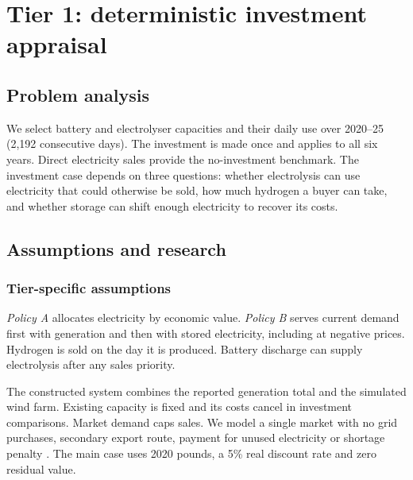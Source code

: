 \chapter{Tier 1: deterministic investment appraisal}\label{chap:tier1}
\section{Problem analysis}\label{sec:problem1}
We select battery and electrolyser capacities and their daily use over
2020--25 (2,192 consecutive days). The investment is made once and applies
to all six years. Direct electricity sales provide the no-investment
benchmark. The investment case depends on three questions: whether
electrolysis can use electricity that could otherwise be sold, how much
hydrogen a buyer can take, and whether storage can shift enough electricity
to recover its costs.

\section{Assumptions and research}\label{sec:research1}
\subsection{Tier-specific assumptions}
\emph{Policy A} allocates electricity by economic value. \emph{Policy B}
serves current demand first with generation and then with stored electricity,
including at negative prices. Hydrogen is sold on the day it is produced.
Battery discharge can supply electrolysis after any sales priority.

The constructed system combines the reported generation total and the
simulated wind farm. Existing capacity is fixed and its costs cancel in
investment comparisons. Market demand caps sales. We model a single market
with no grid purchases, secondary export route, payment for unused
electricity or shortage penalty \cite{brief,teacher}. The main case uses
2020 pounds, a 5\% real discount rate and zero residual value.

